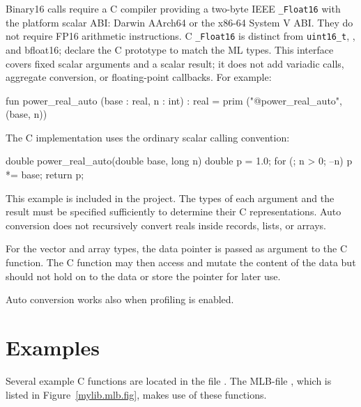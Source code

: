 \documentclass[12pt]{book}
\begin{document}
Binary16 calls require a C compiler providing a two-byte IEEE
\texttt{\_Float16} with the platform scalar ABI: Darwin AArch64 or the
x86-64 System V ABI. They do not require FP16 arithmetic instructions.
C \texttt{\_Float16} is distinct from \texttt{uint16\_t},
, and bfloat16; declare the C prototype to match the ML types.
This interface covers fixed scalar arguments and a scalar result; it does
not add variadic calls, aggregate conversion, or floating-point callbacks.
For example:
\begin{smlcode}
  fun power_real_auto (base : real, n : int) : real =
    prim ("@power_real_auto", (base, n))
\end{smlcode}
\noindent
The C implementation uses the ordinary scalar calling convention:
\begin{scriptcode}
  double power_real_auto(double base, long n) {
    double p = 1.0;
    for (; n > 0; --n) p *= base;
    return p;
  }
\end{scriptcode}
\noindent
This example is included in the  project. The types
of each argument and the result must be specified sufficiently to determine
their C representations. Auto conversion does not recursively convert reals
inside records, lists, or arrays.

For the vector and array types, the data pointer is passed as argument to the C
function. The C function may then access and mutate the content of the data but
should not hold on to the data or store the pointer for later use.

Auto conversion works also when profiling is enabled.


\section{Examples\label{Cexamples.sec}}

%
%
%
%
Several example C functions are located in the file . The
MLB-file , which is listed in Figure~\ref{mylib.mlb.fig},
makes use of these functions.
\end{document}
